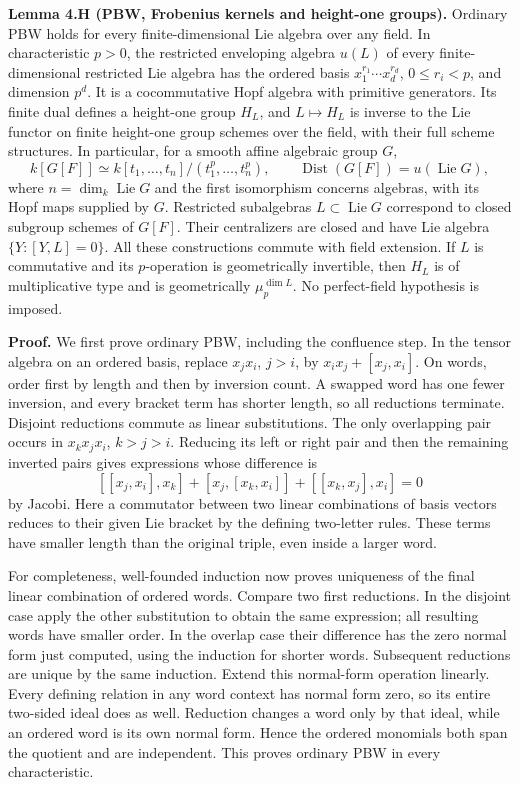 \documentclass[11pt,a4paper,openany]{report}
\begin{document}
\textbf{Lemma 4.H (PBW, Frobenius kernels and height-one groups).} Ordinary PBW holds for every finite-dimensional Lie algebra over any field. In characteristic \(p>0\), the restricted enveloping algebra \(u(L)\) of every finite-dimensional restricted Lie algebra has the ordered basis \(x_1^{r_1}\cdots x_d^{r_d}\), \(0\le r_i<p\), and dimension \(p^d\). It is a cocommutative Hopf algebra with primitive generators. Its finite dual defines a height-one group \(H_L\), and \(L\mapsto H_L\) is inverse to the Lie functor on finite height-one group schemes over the field, with their full scheme structures. In particular, for a smooth affine algebraic group \(G\), \[
 k[G[F]]\simeq k[t_1,\ldots,t_n]/(t_1^p,\ldots,t_n^p),
 \qquad \operatorname{Dist}(G[F])=u(\operatorname{Lie}G),
\] where \(n=\dim_k\operatorname{Lie}G\) and the first isomorphism concerns algebras, with its Hopf maps supplied by \(G\). Restricted subalgebras \(L\subset\operatorname{Lie}G\) correspond to closed subgroup schemes of \(G[F]\). Their centralizers are closed and have Lie algebra \(\{Y:[Y,L]=0\}\). All these constructions commute with field extension. If \(L\) is commutative and its \(p\)-operation is geometrically invertible, then \(H_L\) is of multiplicative type and is geometrically \(\mu_p^{\dim L}\). No perfect-field hypothesis is imposed.

\textbf{Proof.} We first prove ordinary PBW, including the confluence step. In the tensor algebra on an ordered basis, replace \(x_jx_i\), \(j>i\), by \(x_ix_j+[x_j,x_i]\). On words, order first by length and then by inversion count. A swapped word has one fewer inversion, and every bracket term has shorter length, so all reductions terminate. Disjoint reductions commute as linear substitutions. The only overlapping pair occurs in \(x_kx_jx_i\), \(k>j>i\). Reducing its left or right pair and then the remaining inverted pairs gives expressions whose difference is \[
 [[x_j,x_i],x_k]+[x_j,[x_k,x_i]]+[[x_k,x_j],x_i]=0
\] by Jacobi. Here a commutator between two linear combinations of basis vectors reduces to their given Lie bracket by the defining two-letter rules. These terms have smaller length than the original triple, even inside a larger word.

For completeness, well-founded induction now proves uniqueness of the final linear combination of ordered words. Compare two first reductions. In the disjoint case apply the other substitution to obtain the same expression; all resulting words have smaller order. In the overlap case their difference has the zero normal form just computed, using the induction for shorter words. Subsequent reductions are unique by the same induction. Extend this normal-form operation linearly. Every defining relation in any word context has normal form zero, so its entire two-sided ideal does as well. Reduction changes a word only by that ideal, while an ordered word is its own normal form. Hence the ordered monomials both span the quotient and are independent. This proves ordinary PBW in every characteristic.
\end{document}
